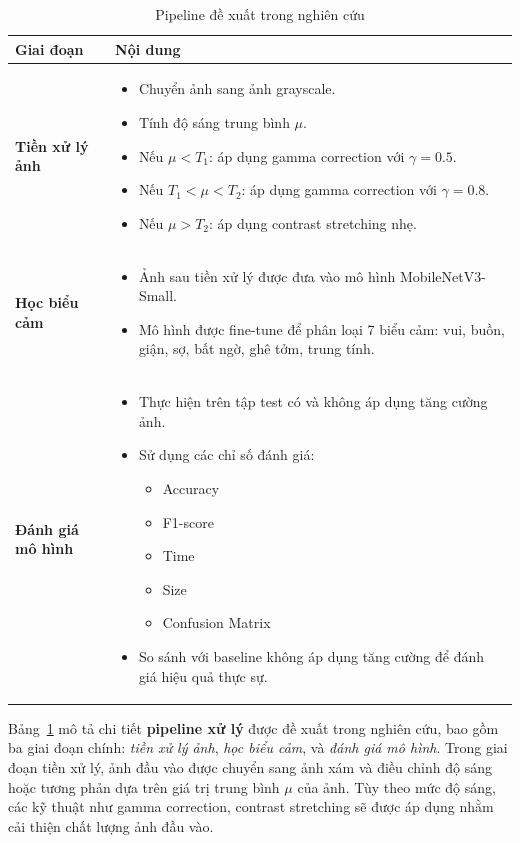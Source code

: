 \begin{table}[H]
\centering
\caption{Pipeline đề xuất trong nghiên cứu}
\label{tab:pipeline}
\begin{tabular}{|p{4cm}|p{10cm}|}
\hline
\textbf{Giai đoạn} & \textbf{Nội dung} \\
\hline
\textbf{Tiền xử lý ảnh} &
\begin{itemize}[leftmargin=*]
    \item Chuyển ảnh sang ảnh grayscale.
    \item Tính độ sáng trung bình $\mu$.
    \item Nếu $\mu < T_1$: áp dụng gamma correction với $\gamma = 0.5$.
    \item Nếu $T_1 < \mu < T_2$: áp dụng gamma correction với $\gamma = 0.8$.
    \item Nếu $\mu > T_2$: áp dụng contrast stretching nhẹ.
\end{itemize} \\
\hline
\textbf{Học biểu cảm} &
\begin{itemize}[leftmargin=*]
    \item Ảnh sau tiền xử lý được đưa vào mô hình MobileNetV3-Small.
    \item Mô hình được fine-tune để phân loại 7 biểu cảm: vui, buồn, giận, sợ, bất ngờ, ghê tởm, trung tính.
\end{itemize} \\
\hline
\textbf{Đánh giá mô hình} &
\begin{itemize}[leftmargin=*]
    \item Thực hiện trên tập test có và không áp dụng tăng cường ảnh.
    \item Sử dụng các chỉ số đánh giá:
    \begin{itemize}
        \item Accuracy
        \item F1-score
        \item Time
        \item Size
        \item Confusion Matrix
    \end{itemize}
    \item So sánh với baseline không áp dụng tăng cường để đánh giá hiệu quả thực sự.
\end{itemize} \\
\hline
\end{tabular}
\end{table}

Bảng~\ref{tab:pipeline} mô tả chi tiết \textbf{pipeline xử lý} được đề xuất trong nghiên cứu, bao gồm ba giai đoạn chính: \textit{tiền xử lý ảnh}, \textit{học biểu cảm}, và \textit{đánh giá mô hình}. Trong giai đoạn tiền xử lý, ảnh đầu vào được chuyển sang ảnh xám và điều chỉnh độ sáng hoặc tương phản dựa trên giá trị trung bình $\mu$ của ảnh. Tùy theo mức độ sáng, các kỹ thuật như gamma correction, contrast stretching sẽ được áp dụng nhằm cải thiện chất lượng ảnh đầu vào.

